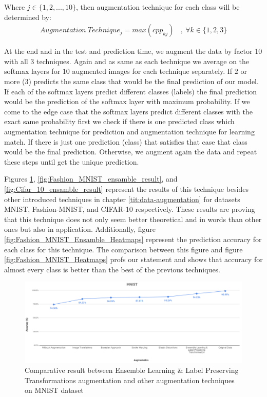 Where $j \in \{1,2,...,10\}$, then augmentation technique for each class will be determined by:
\begin{equation}
  \begin{aligned}
    Augmentation \ Technique_{j} = max(cpp_{kj}) \ \ \ \ , \ \forall k \in \{1,2,3\}
  \end{aligned}
\end{equation}

At the end and in the test and prediction time, we augment the data by factor 10 with all 3
techniques. Again and as same as each technique we average on the softmax layers for 10 augmented
images for each technique separately. If $2$ or more ($3$) predicts the same class that would be the
final prediction of our model. If each of the softmax layers predict different classes (labels) the
final prediction would be the prediction of the softmax layer with maximum probability.  If we come
to the edge case that the softmax layers predict different classes with the exact same probability
first we check if there is one predicted class which augmentation technique for prediction and
augmentation technique for learning match. If there is just one prediction (class) that satisfies
that case that class would be the final prediction. Otherwise, we augment again the data and repeat
these steps until get the unique prediction.

Figures \ref{fig:MNIST_ensamble_result}, \ref{fig:Fashion_MNIST_ensamble_result}, and \ref{fig:Cifar_10_ensamble_result} represent the results of this technique besides other introduced techniques in
chapter \ref{tit:data-augmentation} for datasets MNIST, Fashion-MNIST, and CIFAR-10 respectively. These results are
proving that this technique does not only seem better theoretical and in words than other ones but
also in application. Additionally, figure \ref{fig:Fashion_MNIST_Ensamble_Heatmaps} represent the
prediction accuracy for each class for this technique. The comparison between this figure and figure
\ref{fig:Fashion_MNIST_Heatmaps} profs our statement and shows that accuracy for almost every class is better than the best of the previous techniques.

\begin{figure}
  \centering
  \label{fig:MNIST_ensamble_result}
  \includegraphics[width=1\textwidth]{fig/contribution/mnist-ensamble-result}
  \caption{Comparative result between Ensemble Learning \& Label Preserving Transformations augmentation and other augmentation techniques on MNIST dataset}
\end{figure}


